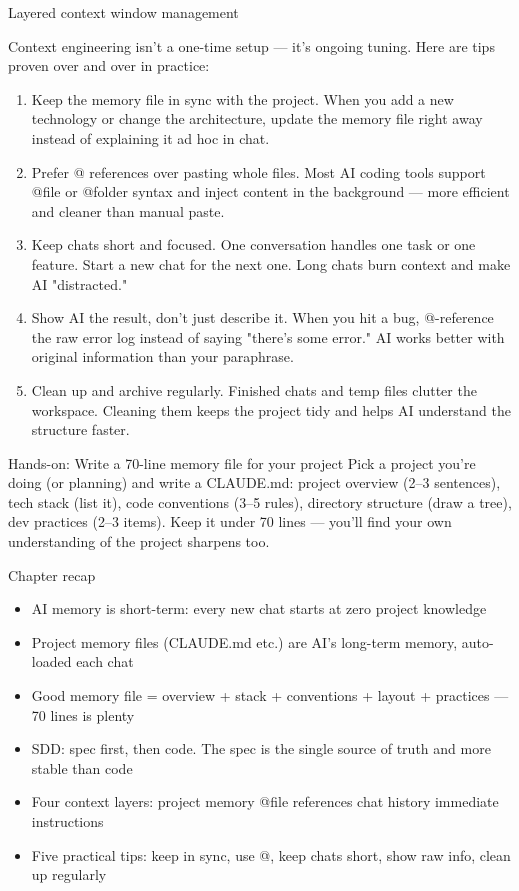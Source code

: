 \begin{center}\small\color{gray}Layered context window management\end{center}


Context engineering isn't a one-time setup — it's ongoing tuning. Here are tips proven over and over in practice:

\begin{enumerate}
  \item Keep the memory file in sync with the project. When you add a new technology or change the architecture, update the memory file right away instead of explaining it ad hoc in chat.
  \item Prefer @ references over pasting whole files. Most AI coding tools support @file or @folder syntax and inject content in the background — more efficient and cleaner than manual paste.
  \item Keep chats short and focused. One conversation handles one task or one feature. Start a new chat for the next one. Long chats burn context and make AI "distracted."
  \item Show AI the result, don't just describe it. When you hit a bug, @-reference the raw error log instead of saying "there's some error." AI works better with original information than your paraphrase.
  \item Clean up and archive regularly. Finished chats and temp files clutter the workspace. Cleaning them keeps the project tidy and helps AI understand the structure faster.
\end{enumerate}

\begin{tcbpractice}{Hands-on: Write a 70-line memory file for your project}
Pick a project you're doing (or planning) and write a CLAUDE.md: project overview (2–3 sentences), tech stack (list it), code conventions (3–5 rules), directory structure (draw a tree), dev practices (2–3 items). Keep it under 70 lines — you'll find your own understanding of the project sharpens too.

\end{tcbpractice}

\begin{tcbsummary}{Chapter recap}
\begin{itemize}
  \item AI memory is short-term: every new chat starts at zero project knowledge
  \item Project memory files (CLAUDE.md etc.) are AI's long-term memory, auto-loaded each chat
  \item Good memory file = overview + stack + conventions + layout + practices — 70 lines is plenty
  \item SDD: spec first, then code. The spec is the single source of truth and more stable than code
  \item Four context layers: project memory @file references chat history immediate instructions
  \item Five practical tips: keep in sync, use @, keep chats short, show raw info, clean up regularly
\end{itemize}

\end{tcbsummary}
